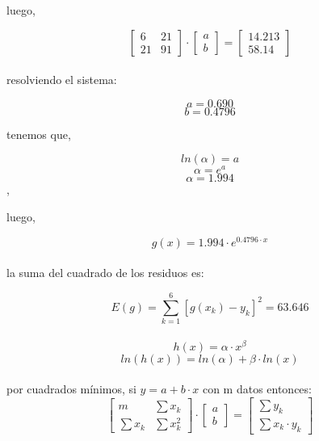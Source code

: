 \documentclass{article}
\begin{document}
luego,

\[
\begin{bmatrix}
    6 & 21 \\
    21 & 91
\end{bmatrix}
\cdot
\begin{bmatrix}
    a \\ b
\end{bmatrix}
=
\begin{bmatrix}
    14.213 \\
    58.14
\end{bmatrix}
\]\\

resolviendo el sistema:

\[a = 0.690\]
\[b = 0.4796\]

tenemos que,

\[ln(\alpha) = a\]
\[\alpha = e^a\]
\[\alpha = 1.994\],

luego,

\[g(x)=1.994 \cdot e^{0.4796 \cdot x}\]\\

la suma del cuadrado de los residuos es:

\[
E(g) = \sum_{k=1}^{6}{[g(x_k)-y_k]^2} = 63.646
\]\\

\[
h(x) = \alpha \cdot x^{\beta}
\]
\[
ln(h(x)) = ln(\alpha) + \beta \cdot ln(x)
\]\\

por cuadrados mínimos, si $y = a + b \cdot x$ con m datos entonces:
\vspace{0.5cm}
\[
\begin{bmatrix}
    m & \sum{x_k} \\
    \sum{x_k} & \sum{x_k^2}
\end{bmatrix}
\cdot
\begin{bmatrix}
    a \\ b
\end{bmatrix}
=
\begin{bmatrix}
    \sum{y_k} \\
    \sum{x_k \cdot y_k}
\end{bmatrix}
\]
\end{document}
